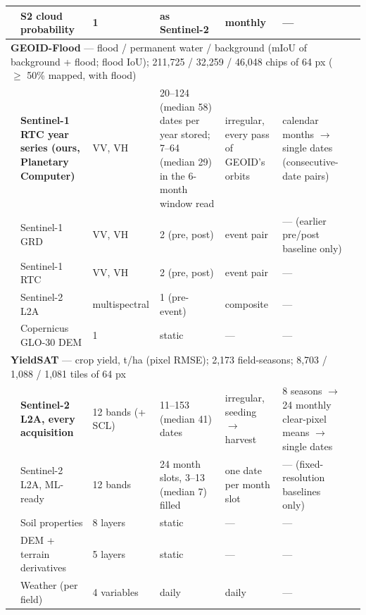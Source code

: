 \begin{tabular}{lllllll}
 & S2 cloud probability & 1 & as Sentinel-2 & monthly & --- \\
\midrule
\multicolumn{6}{l}{\textbf{GEOID-Flood} --- flood / permanent water / background (mIoU of background + flood; flood IoU); 211,725 / 32,259 / 46,048 chips of 64 px ($\geq$ 50\% mapped, with flood)} \\
 & \textbf{Sentinel-1 RTC year series (ours, Planetary Computer)} & VV, VH & 20--124 (median 58) dates per year stored; 7--64 (median 29) in the 6-month window read & irregular, every pass of GEOID's orbits & calendar months $\rightarrow$ single dates (consecutive-date pairs) \\
 & Sentinel-1 GRD & VV, VH & 2 (pre, post) & event pair & --- (earlier pre/post baseline only) \\
 & Sentinel-1 RTC & VV, VH & 2 (pre, post) & event pair & --- \\
 & Sentinel-2 L2A & multispectral & 1 (pre-event) & composite & --- \\
 & Copernicus GLO-30 DEM & 1 & static & --- & --- \\
\midrule
\multicolumn{6}{l}{\textbf{YieldSAT} --- crop yield, t/ha (pixel RMSE); 2,173 field-seasons; 8,703 / 1,088 / 1,081 tiles of 64 px} \\
 & \textbf{Sentinel-2 L2A, every acquisition} & 12 bands (+ SCL) & 11--153 (median 41) dates & irregular, seeding $\rightarrow$ harvest & 8 seasons $\rightarrow$ 24 monthly clear-pixel means $\rightarrow$ single dates \\
 & Sentinel-2 L2A, ML-ready & 12 bands & 24 month slots, 3--13 (median 7) filled & one date per month slot & --- (fixed-resolution baselines only) \\
 & Soil properties & 8 layers & static & --- & --- \\
 & DEM + terrain derivatives & 5 layers & static & --- & --- \\
 & Weather (per field) & 4 variables & daily & daily & --- \\
\bottomrule
\end{tabular}
